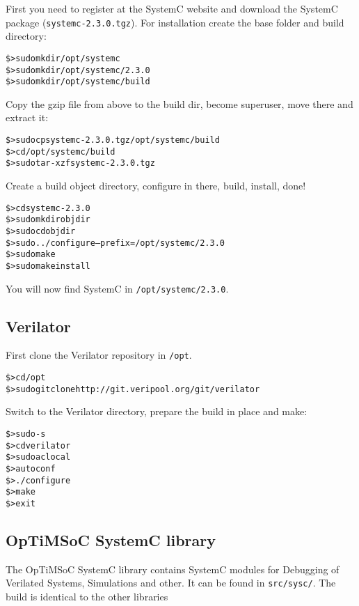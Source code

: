 First you need to register at the SystemC website and download the
SystemC package (\verb|systemc-2.3.0.tgz|). For installation create
the base folder and build directory:

\begin{alltt}
\$> sudo mkdir /opt/systemc
\$> sudo mkdir /opt/systemc/2.3.0
\$> sudo mkdir /opt/systemc/build
\end{alltt}

Copy the gzip file from above to the build dir, become superuser, move
there and extract it:

\begin{alltt}
\$> sudo cp systemc-2.3.0.tgz /opt/systemc/build
\$> cd /opt/systemc/build
\$> sudo tar -xzf systemc-2.3.0.tgz
\end{alltt}

Create a build object directory, configure in there, build, install,
done!

\begin{alltt}
\$> cd systemc-2.3.0
\$> sudo mkdir objdir
\$> sudo cd objdir
\$> sudo ../configure --prefix=/opt/systemc/2.3.0
\$> sudo make
\$> sudo make install
\end{alltt}

You will now find SystemC in \verb|/opt/systemc/2.3.0|.

\subsection{Verilator}

First clone the Verilator repository in \verb|/opt|.

\begin{alltt}
\$> cd /opt
\$> sudo git clone http://git.veripool.org/git/verilator
\end{alltt}

Switch to the Verilator directory, prepare the build in place and make:

\begin{alltt}
\$> sudo -s
\$> cd verilator
\$> sudo aclocal
\$> autoconf
\$> ./configure
\$> make
\$> exit
\end{alltt}

\subsection{OpTiMSoC SystemC library}

The OpTiMSoC SystemC library contains SystemC modules for Debugging of
Verilated Systems, Simulations and other. It can be found in
\verb|src/sysc/|. The build is identical to the other libraries

